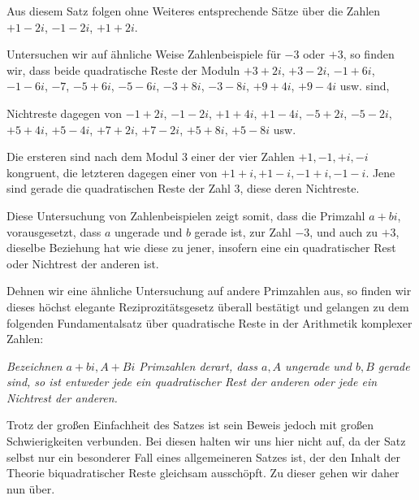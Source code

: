 Aus diesem Satz folgen ohne Weiteres entsprechende Sätze über die Zahlen $+1-2i$, $-1-2i$, $+1+2i$.

Untersuchen wir auf ähnliche Weise Zahlenbeispiele für $-3$ oder $+3$, so finden wir, dass beide quadratische Reste der Moduln $+3+2i$, $+3-2i$,
%
$-1+6i$, $-1-6i$, $-7$, $-5+6i$, $-5-6i$, $-3+8i$, $-3-8i$, $+9+4i$, $+9-4i$ usw. sind,

Nichtreste dagegen von $-1+2i$, $-1-2i$, $+1+4i$, $+1-4i$, $-5+2i$, $-5-2i$, $+5+4i$, $+5-4i$, $+7+2i$, $+7-2i$, $+5+8i$, $+5-8i$ usw.

Die ersteren sind nach dem Modul $3$ einer der vier Zahlen $+1,-1,+i,-i$ kongruent, die letzteren dagegen einer von $+1+i,+1-i,-1+i,-1-i$. Jene sind gerade die quadratischen Reste der Zahl $3$, diese deren Nichtreste.

Diese Untersuchung von Zahlenbeispielen zeigt somit, dass die Primzahl \mbox{$a+bi$}, vorausgesetzt, dass $a$ ungerade und $b$ gerade ist, zur Zahl $-3$, und auch zu $+3$, dieselbe Beziehung hat wie diese zu jener, insofern eine ein quadratischer Rest oder Nichtrest der anderen ist.

Dehnen wir eine ähnliche Untersuchung auf andere Primzahlen aus, so finden wir dieses höchst elegante Reziprozitätsgesetz überall bestätigt und gelangen zu dem folgenden Fundamentalsatz über quadratische Reste in der Arithmetik komplexer Zahlen:

\emph{Bezeichnen $a+bi,A+Bi$ Primzahlen derart, dass $a,A$ ungerade und $b,B$ gerade sind, so ist entweder jede ein quadratischer Rest der anderen oder jede ein Nichtrest der anderen.}

Trotz der großen Einfachheit des Satzes ist sein Beweis jedoch mit großen Schwierigkeiten verbunden. Bei diesen halten wir uns hier nicht auf, da der Satz selbst nur ein besonderer Fall eines allgemeineren Satzes ist, der den Inhalt der Theorie biquadratischer Reste gleichsam ausschöpft. Zu dieser gehen wir daher nun über.

